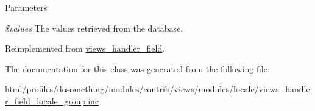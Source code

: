 \begin{DoxyParams}{Parameters}
\item[{\em \$values}]The values retrieved from the database. \end{DoxyParams}


Reimplemented from \hyperlink{classviews__handler__field_a82ff951c5e9ceb97b2eab86f880cbc1e}{views\_\-handler\_\-field}.

The documentation for this class was generated from the following file:\begin{DoxyCompactItemize}
\item 
html/profiles/dosomething/modules/contrib/views/modules/locale/\hyperlink{views__handler__field__locale__group_8inc}{views\_\-handler\_\-field\_\-locale\_\-group.inc}\end{DoxyCompactItemize}
